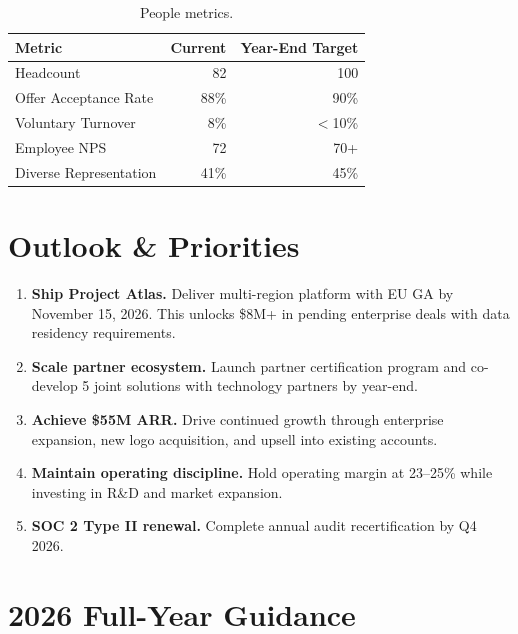 \documentclass[
    language=english,
    doctype=stakeholder-report,
    institution=none,
]{../../omnilatex}
\begin{document}
\begin{table}[h]
    \centering
    \begin{tabular}{lrr}
        \toprule
        \textbf{Metric} & \textbf{Current} & \textbf{Year-End Target} \\
        \midrule
        Headcount              & 82   & 100   \\
        Offer Acceptance Rate  & 88\% & 90\%  \\
        Voluntary Turnover     & 8\%  & $<$10\% \\
        Employee NPS           & 72   & 70+   \\
        Diverse Representation & 41\% & 45\%  \\
        \bottomrule
    \end{tabular}
    \caption{People metrics.}
\end{table}

\section{Outlook \& Priorities}

\begin{enumerate}
    \item \textbf{Ship Project Atlas.} Deliver multi-region platform with
        EU GA by November 15, 2026. This unlocks \$8M+ in pending enterprise
        deals with data residency requirements.
    \item \textbf{Scale partner ecosystem.} Launch partner certification
        program and co-develop 5 joint solutions with technology partners
        by year-end.
    \item \textbf{Achieve \$55M ARR.} Drive continued growth through
        enterprise expansion, new logo acquisition, and upsell into
        existing accounts.
    \item \textbf{Maintain operating discipline.} Hold operating margin
        at 23--25\% while investing in R\&D and market expansion.
    \item \textbf{SOC 2 Type II renewal.} Complete annual audit
        recertification by Q4 2026.
\end{enumerate}

\section{2026 Full-Year Guidance}
\end{document}

